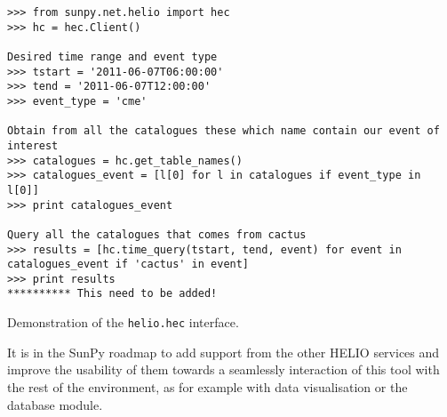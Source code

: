 \begin{listing}[h]
\begin{verbatim}
>>> from sunpy.net.helio import hec
>>> hc = hec.Client()

Desired time range and event type
>>> tstart = '2011-06-07T06:00:00'
>>> tend = '2011-06-07T12:00:00'
>>> event_type = 'cme'

Obtain from all the catalogues these which name contain our event of interest
>>> catalogues = hc.get_table_names()
>>> catalogues_event = [l[0] for l in catalogues if event_type in l[0]]
>>> print catalogues_event

Query all the catalogues that comes from cactus
>>> results = [hc.time_query(tstart, tend, event) for event in catalogues_event if 'cactus' in event]
>>> print results
********** This need to be added!
\end{verbatim}
\caption{Demonstration of the \texttt{helio.hec} interface.}
\label{code:helio}
\end{listing}

It is in the SunPy roadmap to add support from the other HELIO services and improve
the usability of them towards a seamlessly interaction of this tool with the rest of
the environment, as for example with data visualisation or the database module.
